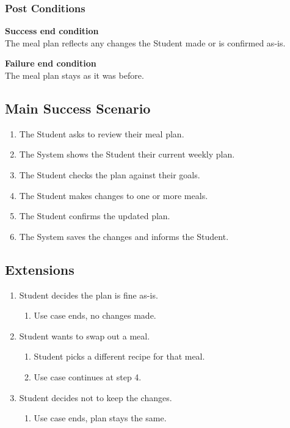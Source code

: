 \documentclass[10pt,letterpaper]{article}
\begin{document}
\subsubsection*{Post Conditions}

\textbf{Success end condition}\\
The meal plan reflects any changes the Student made or is confirmed as-is.

\textbf{Failure end condition}\\
The meal plan stays as it was before.

\subsection*{Main Success Scenario}
\begin{enumerate}
    \item The Student asks to review their meal plan.
    \item The System shows the Student their current weekly plan.
    \item The Student checks the plan against their goals.
    \item The Student makes changes to one or more meals.
    \item The Student confirms the updated plan.
    \item The System saves the changes and informs the Student.
\end{enumerate}

\subsection*{Extensions}
\begin{enumerate}
    \item[3a.] Student decides the plan is fine as-is.
    \begin{enumerate}
        \item[1.] Use case ends, no changes made.
    \end{enumerate}
    \item[4a.] Student wants to swap out a meal.
    \begin{enumerate}
        \item[1.] Student picks a different recipe for that meal.
        \item[2.] Use case continues at step 4.
    \end{enumerate}
    \item[5a.] Student decides not to keep the changes.
    \begin{enumerate}
        \item[1.] Use case ends, plan stays the same.
    \end{enumerate}
\end{enumerate}
\end{document}
